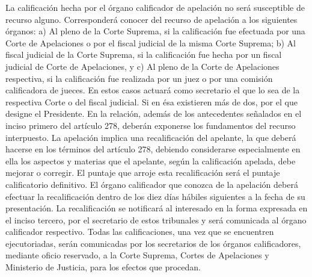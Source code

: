     La calificación hecha por el órgano calificador de apelación no será susceptible de recurso alguno.
    Corresponderá conocer del recurso de apelación a los siguientes órganos:
    a) Al pleno de la Corte Suprema, si la calificación fue efectuada por una Corte de Apelaciones o por el fiscal judicial de la misma Corte Suprema;
    b) Al fiscal judicial de la Corte Suprema, si la calificación fue hecha por un fiscal judicial de Corte de Apelaciones, y
    c) Al pleno de la Corte de Apelaciones respectiva, si la calificación fue realizada por un juez o por una comisión calificadora de jueces.
    En estos casos actuará como secretario el que lo sea de la respectiva Corte o del fiscal judicial. Si en ésa existieren más de dos, por el que designe el Presidente. En la relación, además de los antecedentes señalados en el inciso primero del artículo 278, deberán exponerse los fundamentos del recurso interpuesto.
    La apelación implica una recalificación del apelante, la que deberá hacerse en los términos del artículo 278, debiendo considerarse especialmente en ella los aspectos y materias que el apelante, según la calificación apelada, debe mejorar o corregir. El puntaje que arroje esta recalificación será el puntaje calificatorio definitivo. El órgano calificador que conozca de la apelación deberá efectuar la recalificación dentro de los diez días hábiles siguientes a la fecha de su presentación. La recalificación se notificará al interesado en la forma expresada en el inciso tercero, por el secretario de estos tribunales y será comunicada al órgano calificador respectivo.
    Todas las calificaciones, una vez que se encuentren ejecutoriadas, serán comunicadas por los secretarios de los órganos calificadores, mediante oficio reservado, a la Corte Suprema, Cortes de Apelaciones y Ministerio de Justicia, para los efectos que procedan.



